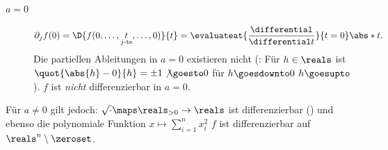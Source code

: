 \begin{beispiele}
\begin{enumerate}
\begin{description}
            \item[\( a=0 \)]
            \begin{align*}
                \partial_j f(0)=\D{f(0,\dotsc,\underset{j\text{-te}}{t},\dotsc,0)}{t}
                =\evaluateat{\frac{\differential}{\differential t}}{t=0}\abs*{t}.
            \end{align*} 
            \timplies Die partiellen Ableitungen in \( a=0 \) existieren nicht (: Für \( h\in \reals \) ist \( \quot{\abs{h}-0}{h}=\pm 1\not\goesto 0 \) für \( h\goesdownto 0 \) \bzw \( h\goesupto \)). \timplies \( f \) ist \emph{nicht} differenzierbar in \( a=0 \).
        \end{description}
        Für \( a\neq 0 \) gilt jedoch: \( \sqrt{\cdot}\maps \reals_{>0} \to \reals \) ist differenzierbar () und ebenso die polynomiale Funktion \( x\mapsto \sum_{i=1}^{n}x_i^2 \) \timplies \( f \) ist differenzierbar auf \( \reals^n\setminus \zeroset\).


\end{enumerate}
\end{beispiele}
